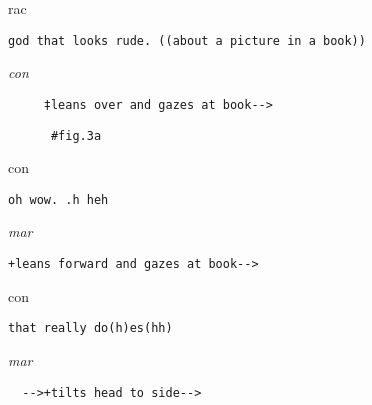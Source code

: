 \documentclass[output=paper,nonflat,modfont,draft]{langsci/langscibook}
\begin{document}

\begin{transbox}{1}{rac}
\begin{verbatim}
god that looks rude. ((about a picture in a book))
\end{verbatim}
\end{transbox}


\begin{transbox}{3}{\textit{con}}
\begin{verbatim}
     ‡leans over and gazes at book-->
\end{verbatim}
\end{transbox}

\begin{transbox}{4}{\fig}
\begin{verbatim}
      #fig.3a
\end{verbatim}
\end{transbox}

\begin{transbox}{5}{con}
\begin{verbatim}
oh wow. .h heh
\end{verbatim}
\end{transbox}


\begin{transbox}{7}{\textit{mar}}
\begin{verbatim}
+leans forward and gazes at book-->
\end{verbatim}
\end{transbox}

\begin{transbox}{8}{con}
\begin{verbatim}
that really do(h)es(hh)
\end{verbatim}
\end{transbox}


\begin{mdframedkendrick}[style=firstfoc]
\begin{transbox}{10}{\textit{mar}}
\begin{verbatim}
  -->+tilts head to side-->
\end{verbatim}
\end{transbox}
\end{mdframedkendrick}\vspace{-5mm}
\end{document}

